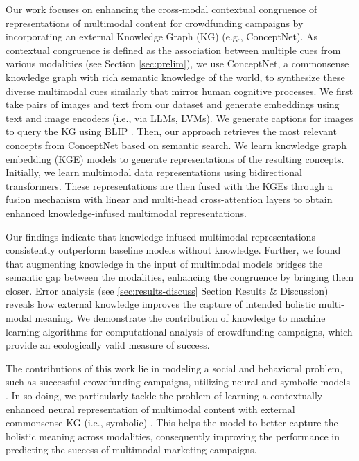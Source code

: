 Our work focuses on enhancing the cross-modal contextual congruence of representations of multimodal content for crowdfunding campaigns by incorporating an external Knowledge Graph (KG) (e.g., ConceptNet). As contextual congruence is defined as the association between multiple cues from various modalities (see Section \ref{sec:prelim}), we use ConceptNet, a commonsense knowledge graph with rich semantic knowledge of the world, to synthesize these diverse multimodal cues similarly that mirror human cognitive processes. We first take pairs of images and text from our dataset and generate embeddings using text and image encoders (i.e., via LLMs, LVMs). We generate captions for images to query the KG using BLIP \cite{li2022blip}. Then, our approach retrieves the most relevant concepts from ConceptNet based on semantic search. We learn knowledge graph embedding (KGE) models to generate representations of the resulting concepts. Initially, we learn multimodal data representations using bidirectional transformers. These representations are then fused with the KGEs through a fusion mechanism with linear and multi-head cross-attention layers to obtain enhanced knowledge-infused multimodal representations. 



Our findings indicate that knowledge-infused multimodal representations consistently outperform baseline models without knowledge. Further, we found that augmenting knowledge in the input of multimodal models bridges the semantic gap between the modalities, enhancing the congruence by bringing them closer. Error analysis (see \ref{sec:results-discuss} Section Results \& Discussion) reveals how external knowledge improves the capture of intended holistic multi-modal meaning. We demonstrate the contribution of knowledge to machine learning algorithms for computational analysis of crowdfunding campaigns, which provide an ecologically valid measure of success.

The contributions of this work lie in modeling a social and behavioral problem, such as successful crowdfunding campaigns, utilizing neural and symbolic models \cite{sap2022neural}. In so doing, we particularly tackle the problem of learning a contextually enhanced neural representation of multimodal content with external commonsense KG (i.e., symbolic) \cite{yu2022probabilistic}. This helps the model to better capture the holistic meaning across modalities, consequently improving the performance in predicting the success of multimodal marketing campaigns.

